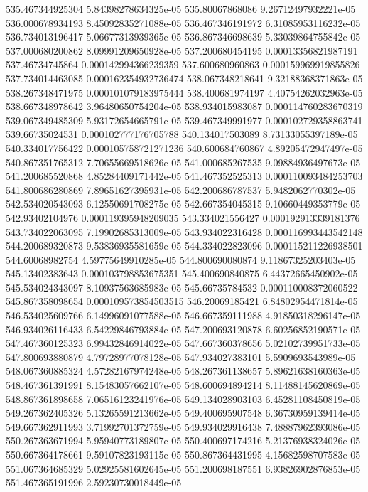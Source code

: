{535.467344925304 5.84398278634325e-05
535.80067868086 9.26712497932221e-05
536.000678934193 8.45092835271088e-05
536.467346191972 6.31085953116232e-05
536.734013196417 5.06677313939365e-05
536.867346698639 5.33039864755842e-05
537.000680200862 8.09991209650928e-05
537.200680454195 0.00013356821987191
537.46734745864 0.000142994366239359
537.600680960863 0.000159969919855826
537.734014463085 0.000162354932736474
538.067348218641 9.32188368371863e-05
538.267348471975 0.000101079183975444
538.400681974197 4.40754262032963e-05
538.667348978642 3.96480650754204e-05
538.934015983087 0.000114760283670319
539.067349485309 5.93172654665791e-05
539.467349991977 0.000102729358863741
539.66735024531 0.000102777176705788
540.134017503089 8.73133055397189e-05
540.334017756422 0.000105758721271236
540.600684760867 4.89205472947497e-05
540.867351765312 7.70655669518626e-05
541.000685267535 9.09884936497673e-05
541.200685520868 4.85284409171442e-05
541.467352525313 0.000110093484253703
541.800686280869 7.89651627395931e-05
542.200686787537 5.9482062770302e-05
542.534020543093 6.12550691708275e-05
542.667354045315 9.10660449353779e-05
542.93402104976 0.000119395948209035
543.334021556427 0.000192913339181376
543.734022063095 7.19902685313009e-05
543.934022316428 0.000116993443542148
544.200689320873 9.53836935581659e-05
544.334022823096 0.000115211226938501
544.60068982754 4.59775649910285e-05
544.800690080874 9.11867325203403e-05
545.13402383643 0.000103798853675351
545.400690840875 6.44372665450902e-05
545.534024343097 8.10937563685983e-05
545.66735784532 0.000110008372060522
545.867358098654 0.000109573854503515
546.20069185421 6.84802954471814e-05
546.534025609766 6.14996091077588e-05
546.667359111988 4.91850318296147e-05
546.934026116433 6.54229846793884e-05
547.200693120878 6.60256852190571e-05
547.467360125323 6.99432846914022e-05
547.667360378656 5.02102739951733e-05
547.800693880879 4.79728977078128e-05
547.934027383101 5.5909693543989e-05
548.067360885324 4.57282167974248e-05
548.267361138657 5.89621638160363e-05
548.467361391991 8.15483057662107e-05
548.600694894214 8.11488145620869e-05
548.867361898658 7.06516123241976e-05
549.134028903103 6.45281108450819e-05
549.267362405326 5.13265591213662e-05
549.400695907548 6.36730959139414e-05
549.667362911993 3.71992701372759e-05
549.934029916438 7.48887962393086e-05
550.267363671994 5.95940773189807e-05
550.400697174216 5.21376938324026e-05
550.667364178661 9.59107823193115e-05
550.867364431995 4.15682598707583e-05
551.067364685329 5.02925581602645e-05
551.200698187551 6.93826902876853e-05
551.467365191996 2.59230730018449e-05
}

